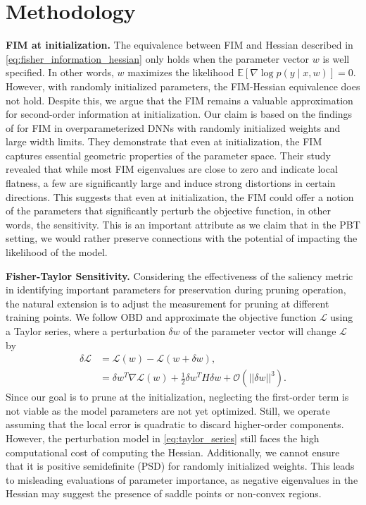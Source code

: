 \section{Methodology}

\textbf{FIM at initialization.} The equivalence between FIM and Hessian described in \eqref{eq:fisher_information_hessian} only holds when the parameter vector $w$ is well specified. In other words, $w$ maximizes the likelihood $\mathbb{E}[\nabla \log p(y \mid x, w)] = 0$. However, with randomly initialized parameters, the FIM-Hessian equivalence does not hold. Despite this, we argue that the FIM remains a valuable approximation for second-order information at initialization. Our claim is based on the findings of \citet{karakida2019universal} for FIM in overparameterized DNNs with randomly initialized weights and large width limits. They demonstrate that even at initialization, the FIM captures essential geometric properties of the parameter space. Their study revealed that while most FIM eigenvalues are close to zero and indicate local flatness, a few are significantly large and induce strong distortions in certain directions. This suggests that even at initialization, the FIM could offer a notion of the parameters that significantly perturb the objective function, in other words, the sensitivity. This is an important attribute as we claim that in the PBT setting, we would rather preserve connections with the potential of impacting the likelihood of the model.

\textbf{Fisher-Taylor Sensitivity.} Considering the effectiveness of the saliency metric in identifying important parameters for preservation during pruning operation, the natural extension is to adjust the measurement for pruning at different training points. We follow OBD \cite{lecun1989optimal} and approximate the objective function $\mathcal{L}$ using a Taylor series, where a perturbation $\delta w$ of the parameter vector will change $\mathcal{L}$ by
\begin{align}
    \delta \mathcal{L} 
    &= \mathcal{L}(w) - \mathcal{L}(w + \delta w),
    \nonumber \\
    &= \delta w^T \nabla \mathcal{L}(w) + \frac{1}{2} \delta w^T H \delta w + \mathcal{O}(||\delta w||^3).
    \label{eq:taylor_series}
\end{align}
Since our goal is to prune at the initialization, neglecting the first-order term is not viable as the model parameters are not yet optimized. Still, we operate assuming that the local error is quadratic to discard higher-order components. However, the perturbation model in \eqref{eq:taylor_series} still faces the high computational cost of computing the Hessian. Additionally, we cannot ensure that it is positive semidefinite (PSD) for randomly initialized weights. This leads to misleading evaluations of parameter importance, as negative eigenvalues in the Hessian may suggest the presence of saddle points or non-convex regions.

